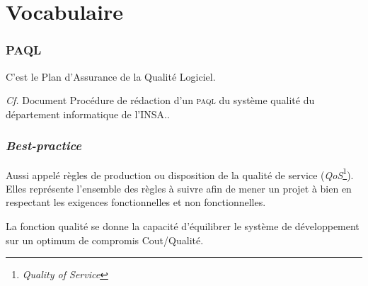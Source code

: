 \part{Vocabulaire}
\section{PAQL}
C'est le Plan d'Assurance de la Qualité Logiciel.

\textsl{Cf.} Document \og Procédure de rédaction d'un \textsc{paql} du système qualité du département informatique de l'INSA.\fg.

\section{\textsl{Best-practice}}
Aussi appelé règles de production ou disposition de la qualité de service (\textsl{QoS}\footnote{\textsl{Quality of Service}}). Elles représente l'ensemble des règles à suivre afin de mener un projet à bien en respectant les exigences fonctionnelles et non fonctionnelles.

La fonction qualité se donne la capacité d'équilibrer le système de développement sur un optimum de compromis Cout/Qualité.
